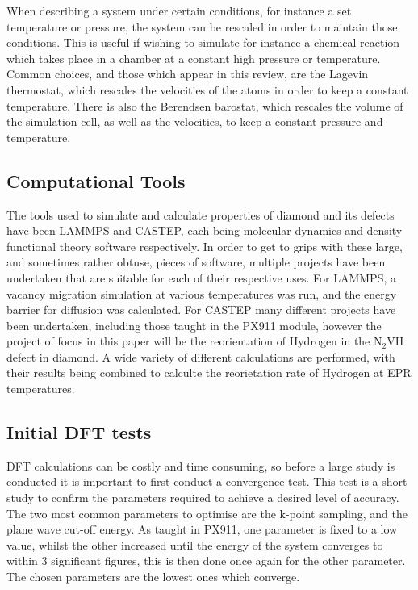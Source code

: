\documentclass[10pt,a4paper,twocolumn,twoside]{extarticle}
\begin{document}
When describing a system under certain conditions, for instance a set temperature or pressure, the system can be rescaled in order to maintain those conditions. This is useful if wishing to simulate for instance a chemical reaction which takes place in a chamber at a constant high pressure or temperature. Common choices, and those which appear in this review, are the Lagevin thermostat, which rescales the velocities of the atoms in order to keep a constant temperature. There is also the Berendsen barostat, which rescales the volume of the simulation cell, as well as the velocities, to keep a constant pressure and temperature. 

\subsection{Computational Tools}
The tools used to simulate and calculate properties of diamond and its defects have been LAMMPS and CASTEP, each being molecular dynamics and density functional theory software respectively. In order to get to grips with these large, and sometimes rather obtuse, pieces of software, multiple projects have been undertaken that are suitable for each of their respective uses. For LAMMPS, a vacancy migration simulation at various temperatures was run, and the energy barrier for diffusion was calculated. For CASTEP many different projects have been undertaken, including those taught in the PX911 module, however the project of focus in this paper will be the reorientation of Hydrogen in the N$_2$VH defect in diamond. A wide variety of different calculations are performed, with their results being combined to calculte the reorietation rate of Hydrogen at EPR temperatures. 

\subsection{Initial DFT tests}
DFT calculations can be costly and time consuming, so before a large study is conducted it is important to first conduct a convergence test. This test is a short study to confirm the parameters required to achieve a desired level of accuracy. The two most common parameters to optimise are the k-point sampling, and the plane wave cut-off energy. As taught in PX911, one parameter is fixed to a low value, whilst the other increased until the energy of the system converges to within 3 significant figures, this is then done once again for the other parameter. The chosen parameters are the lowest ones which converge. 
\end{document}
